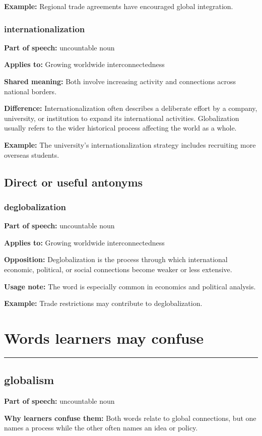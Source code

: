 \documentclass[11pt]{article}
\newcommand{\sectionrule}{\par\vspace{-0.5em}\noindent\textcolor{Accent}{\rule{\linewidth}{0.6pt}}\par}
\begin{document}
\textbf{Example:} Regional trade agreements have encouraged global integration.

\subsubsection{internationalization}
\textbf{Part of speech:} uncountable noun

\textbf{Applies to:} Growing worldwide interconnectedness

\textbf{Shared meaning:} Both involve increasing activity and connections across national borders.

\textbf{Difference:} Internationalization often describes a deliberate effort by a company, university, or institution to expand its international activities. Globalization usually refers to the wider historical process affecting the world as a whole.

\textbf{Example:} The university's internationalization strategy includes recruiting more overseas students.

\subsection{Direct or useful antonyms}
\subsubsection{deglobalization}
\textbf{Part of speech:} uncountable noun

\textbf{Applies to:} Growing worldwide interconnectedness

\textbf{Opposition:} Deglobalization is the process through which international economic, political, or social connections become weaker or less extensive.

\textbf{Usage note:} The word is especially common in economics and political analysis.

\textbf{Example:} Trade restrictions may contribute to deglobalization.

\section{Words learners may confuse}
\sectionrule
\subsection{globalism}
\textbf{Part of speech:} uncountable noun

\textbf{Why learners confuse them:} Both words relate to global connections, but one names a process while the other often names an idea or policy.
\end{document}
